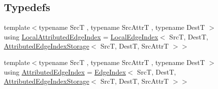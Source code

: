 \subsection*{Typedefs}
\begin{DoxyCompactItemize}
\item 
{\footnotesize template$<$typename Src\-T , typename Src\-Attr\-T , typename Dest\-T $>$ }\\using \hyperlink{namespaceshad_a1c829d1964a31a103acef7260a679a67}{Local\-Attributed\-Edge\-Index} = \hyperlink{classshad_1_1LocalEdgeIndex}{Local\-Edge\-Index}$<$ Src\-T, Dest\-T, \hyperlink{classshad_1_1AttributedEdgeIndexStorage}{Attributed\-Edge\-Index\-Storage}$<$ Src\-T, Dest\-T, Src\-Attr\-T $>$$>$
\item 
{\footnotesize template$<$typename Src\-T , typename Src\-Attr\-T , typename Dest\-T $>$ }\\using \hyperlink{namespaceshad_a4fcdd0f79705e26acfcc087f7299e70e}{Attributed\-Edge\-Index} = \hyperlink{classshad_1_1EdgeIndex}{Edge\-Index}$<$ Src\-T, Dest\-T, \hyperlink{classshad_1_1AttributedEdgeIndexStorage}{Attributed\-Edge\-Index\-Storage}$<$ Src\-T, Dest\-T, Src\-Attr\-T $>$$>$
\end{DoxyCompactItemize}
